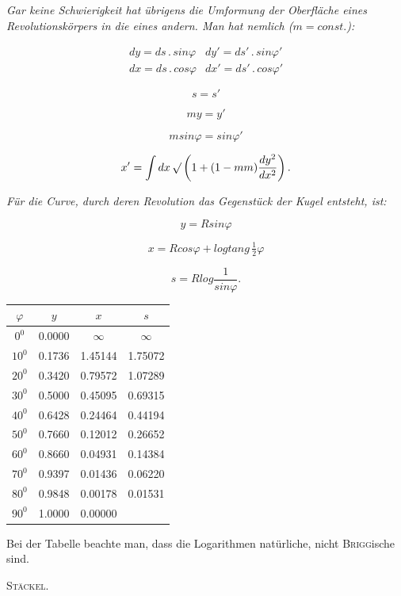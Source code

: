 \par{}%
\emph{Gar keine Schwierigkeit hat übrigens die Umformung der Oberfläche eines Revolutionskörpers in die eines andern. Man hat nemlich ($m = \mathit{const.}$):}

\[
\begin{array}{cc}
dy = ds \,.\, \mathit{sin}\varphi & dy' = ds' \,.\, \mathit{sin}\varphi' \\[4pt]
dx = ds \,.\, \mathit{cos}\varphi & dx' = ds' \,.\, \mathit{cos}\varphi'
\end{array}
\]

\[
s = s'
\]

\[
my = y'
\]

\[
m \mathit{sin}\varphi = \mathit{sin}\varphi'
\]

\[
x' = \int dx\, \mathord{\surd}\left(1 + (1 - mm)\frac{dy^2}{dx^2}\right).
\]

\begin{center}\begin{minipage}{\linewidth}\centering

\end{minipage}\end{center}

\emph{Für die Curve, durch deren Revolution das Gegenstück der Kugel entsteht, ist:}

\[
y = R \mathit{sin}\varphi
\]

\[
x = R \mathit{cos}\varphi + \mathit{log} \mathit{tang}\, \tfrac{1}{2}\varphi
\]

\[
s = R \mathit{log} \frac{1}{\mathit{sin}\varphi}.
\]

\begin{center}\begin{minipage}{\linewidth}\centering

\end{minipage}\end{center}

\begin{center}
\begin{tabular}{c|c|c|c}
$\varphi$ & $y$ & $x$ & $s$ \\
\hline
$0^0$ & 0.0000 & $\infty$ & $\infty$ \\
$10^0$ & 0.1736 & 1.45144 & 1.75072 \\
$20^0$ & 0.3420 & 0.79572 & 1.07289 \\
$30^0$ & 0.5000 & 0.45095 & 0.69315 \\
$40^0$ & 0.6428 & 0.24464 & 0.44194 \\
$50^0$ & 0.7660 & 0.12012 & 0.26652 \\
$60^0$ & 0.8660 & 0.04931 & 0.14384 \\
$70^0$ & 0.9397 & 0.01436 & 0.06220 \\
$80^0$ & 0.9848 & 0.00178 & 0.01531 \\
$90^0$ & 1.0000 & 0.00000 & \\
\end{tabular}
\end{center}

Bei der Tabelle beachte man, dass die Logarithmen natürliche, nicht \textsc{Brigg}ische sind.

\hfill \textsc{Stäckel}.
